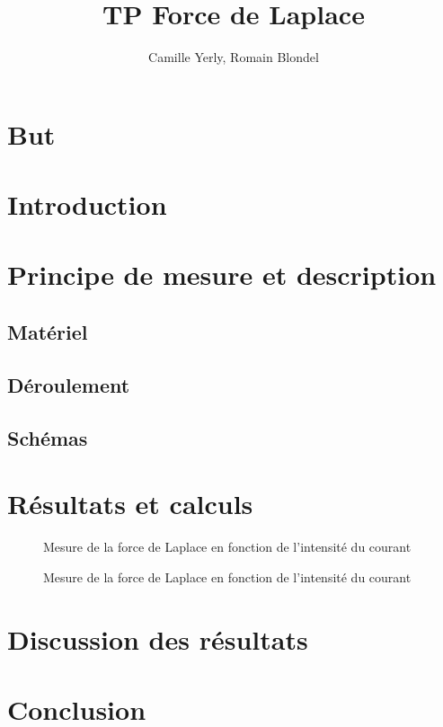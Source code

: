 \documentclass[11pt]{article}
\title{\textbf{TP Force de Laplace}}
\author{Camille Yerly, Romain Blondel}
\affil{2M8, Gymnase Auguste Piccard}
\begin{document}
    \maketitle

    \section{But}\label{sec:but}


    \section{Introduction}\label{sec:introduction}


    \section{Principe de mesure et description}\label{sec:principe-de-mesure-et-description}

    \subsection{Matériel}\label{subsec:materiel}

    \subsection{Déroulement}\label{subsec:deroulement}

    \subsection{Schémas}\label{subsec:schemas}


    \section{Résultats et calculs}\label{sec:resultats-et-calculs}
    
    \begin{figure}[H]
        \centering
        
        \caption{Mesure de la force de Laplace en fonction de l'intensité du courant}
        \label{fig:courant}
    \end{figure}

    \begin{figure}[H]
        \centering
        \caption{Mesure de la force de Laplace en fonction de l'intensité du courant}
        \label{fig:courant-plus}
    \end{figure}

    \section{Discussion des résultats}\label{sec:discussion-des-resultats}


    \section{Conclusion}\label{sec:conclusion}
\end{document}
